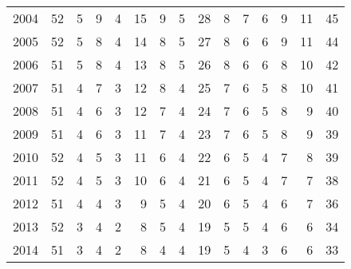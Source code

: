 \begin{tabular}{lrrrrrrrrrrrrrr}
2004 &               52 &             5 &        9 &          4 &             15 &            9 &           5 &           28 &         8 &             7 &              6 &        9 &              11 &           45 \\
2005 &               52 &             5 &        8 &          4 &             14 &            8 &           5 &           27 &         8 &             6 &              6 &        9 &              11 &           44 \\
2006 &               51 &             5 &        8 &          4 &             13 &            8 &           5 &           26 &         8 &             6 &              6 &        8 &              10 &           42 \\
2007 &               51 &             4 &        7 &          3 &             12 &            8 &           4 &           25 &         7 &             6 &              5 &        8 &              10 &           41 \\
2008 &               51 &             4 &        6 &          3 &             12 &            7 &           4 &           24 &         7 &             6 &              5 &        8 &               9 &           40 \\
2009 &               51 &             4 &        6 &          3 &             11 &            7 &           4 &           23 &         7 &             6 &              5 &        8 &               9 &           39 \\
2010 &               52 &             4 &        5 &          3 &             11 &            6 &           4 &           22 &         6 &             5 &              4 &        7 &               8 &           39 \\
2011 &               52 &             4 &        5 &          3 &             10 &            6 &           4 &           21 &         6 &             5 &              4 &        7 &               7 &           38 \\
2012 &               51 &             4 &        4 &          3 &              9 &            5 &           4 &           20 &         6 &             5 &              4 &        6 &               7 &           36 \\
2013 &               52 &             3 &        4 &          2 &              8 &            5 &           4 &           19 &         5 &             5 &              4 &        6 &               6 &           34 \\
2014 &               51 &             3 &        4 &          2 &              8 &            4 &           4 &           19 &         5 &             4 &              3 &        6 &               6 &           33 \\

\end{tabular}
